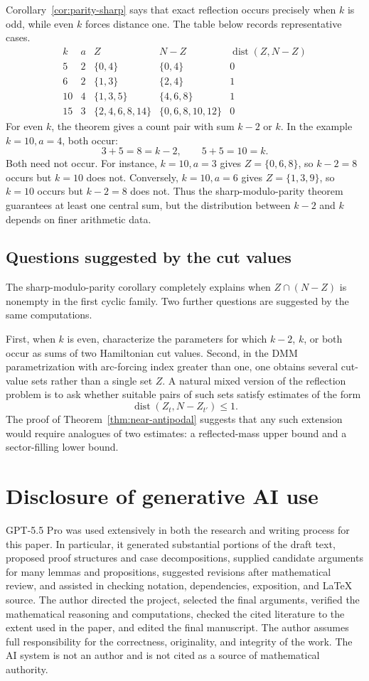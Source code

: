 \documentclass[11pt]{article}
\newcommand{\dist}{\operatorname{dist}}
\begin{document}
Corollary~\ref{cor:parity-sharp} says that exact reflection occurs precisely when $k$ is odd, while even $k$ forces distance one.  The table below records representative cases.
\[
\begin{array}{c|c|c|c|c}
 k&a&Z&N-Z&\dist(Z,N-Z)\\ \hline
 5&2&\{0,4\}&\{0,4\}&0\\
 6&2&\{1,3\}&\{2,4\}&1\\
 10&4&\{1,3,5\}&\{4,6,8\}&1\\
 15&3&\{2,4,6,8,14\}&\{0,6,8,10,12\}&0
\end{array}
\]
For even $k$, the theorem gives a count pair with sum $k-2$ or $k$.  In the example $k=10,a=4$, both occur:
\[
        3+5=8=k-2,
        \qquad
        5+5=10=k.
\]
Both need not occur.  For instance, $k=10,a=3$ gives $Z=\{0,6,8\}$, so $k-2=8$ occurs but $k=10$ does not.  Conversely, $k=10,a=6$ gives $Z=\{1,3,9\}$, so $k=10$ occurs but $k-2=8$ does not.  Thus the sharp-modulo-parity theorem guarantees at least one central sum, but the distribution between $k-2$ and $k$ depends on finer arithmetic data.

\subsection{Questions suggested by the cut values}

The sharp-modulo-parity corollary completely explains when $Z\cap(N-Z)$ is nonempty in the first cyclic family.  Two further questions are suggested by the same computations.

First, when $k$ is even, characterize the parameters for which $k-2$, $k$, or both occur as sums of two Hamiltonian cut values.  Second, in the DMM parametrization with arc-forcing index greater than one, one obtains several cut-value sets rather than a single set $Z$.  A natural mixed version of the reflection problem is to ask whether suitable pairs of such sets satisfy estimates of the form
\[
        \dist(Z_t,N-Z_{t'})\le1.
\]
The proof of Theorem~\ref{thm:near-antipodal} suggests that any such extension would require analogues of two estimates: a reflected-mass upper bound and a sector-filling lower bound.


\section*{Disclosure of generative AI use}

GPT-5.5 Pro was used extensively in both the research and writing process for this paper.  In particular, it generated substantial portions of the draft text, proposed proof structures and case decompositions, supplied candidate arguments for many lemmas and propositions, suggested revisions after mathematical review, and assisted in checking notation, dependencies, exposition, and LaTeX source.  The author directed the project, selected the final arguments, verified the mathematical reasoning and computations, checked the cited literature to the extent used in the paper, and edited the final manuscript.  The author assumes full responsibility for the correctness, originality, and integrity of the work.  The AI system is not an author and is not cited as a source of mathematical authority.
\end{document}
